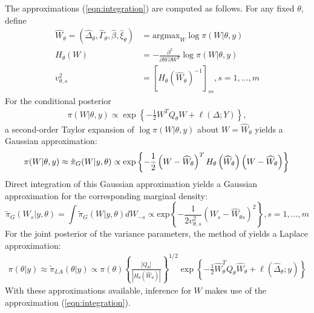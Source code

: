 \documentclass[ba]{imsart}
\begin{document}
The approximations (\ref{eqn:integration}) are computed as follows. For any fixed $\theta$, define
\begin{equation}\begin{aligned}\label{eqn:modeandhessian}
\widehat{W}_{\theta} = \left( \widehat{\Delta}_{\theta},\widehat{\Gamma}_{\theta},\widehat{\beta},\widehat{\xi}_{\theta}\right) &= \text{argmax}_{W}\log\pi(W|\theta,y) \\ 
H_{\theta}(W) &= -\frac{\partial^{2}}{\partial W \partial W^{T}}\log\pi(W|\theta,y) \\
v_{\theta,s}^{2} &= \left[H_\theta \left(\widehat{W}_{\theta}\right) ^ {-1} \right]_{ss}, s = 1,\ldots,m
\end{aligned}\end{equation}
For the conditional posterior
\begin{equation}\begin{aligned}\label{eqn:condpost}
\pi(W|\theta,y) \propto \exp\left\lbrace -\frac{1}{2}W^{T}Q_{\theta}W + \ell\left(\Delta;Y\right)\right\rbrace,
\end{aligned}\end{equation}
a second-order Taylor expansion of $\log\pi(W|\theta,y)$ about $W = \widehat{W}_{\theta}$ yields a Gaussian approximation:
\begin{equation}\label{eqn:gaussianapprox}
\pi(W|\theta,y) \approx \tilde{\pi}_{G}(W|y,\theta) \propto \text{exp}\left\{-\frac{1}{2} \left(W-\widehat{W}_{\theta} \right)^T H_\theta\left(\widehat{W}_{\theta}\right) \left(W-\widehat{W}_{\theta} \right) \right\} \\
\end{equation}
Direct integration of this Gaussian approximation yields a Gaussian approximation for the corresponding marginal density:
\begin{equation}\label{eqb:marginalgaussianapprox}
\tilde{\pi}_{G}(W_{s}|y,\theta) = \int\tilde{\pi}_{G}(W|y,\theta)dW_{-s} \propto\text{exp}\left\{-\frac{1}{2v_{\theta,s}^{2}} \left(W_s-\widehat{W}_{\theta s} \right)^2 \right\}, s = 1,\ldots,m
\end{equation}
For the joint posterior of the variance parameters, the method of \cite{tierney} yields a Laplace approximation:
\begin{equation}\begin{aligned}\label{eqn:laplace}
\pi(\theta|y) \approx \tilde{\pi}_{LA}(\theta|y) \propto \pi(\theta)\left\{\frac{\left|Q_{\theta}\right|}{\left|H_{\theta}\left(\widehat{W}_{\theta}\right)\right|}\right\}^{1/2}\exp\left\{ -\frac{1}{2}\widehat{W}_{\theta}^{T}Q_{\theta}\widehat{W}_{\theta} + \ell\left(\widehat{\Delta}_{\theta};y \right)\right\}
\end{aligned}\end{equation}
With these approximations available, inference for $W$ makes use of the approximation (\ref{eqn:integration}).
\end{document}
